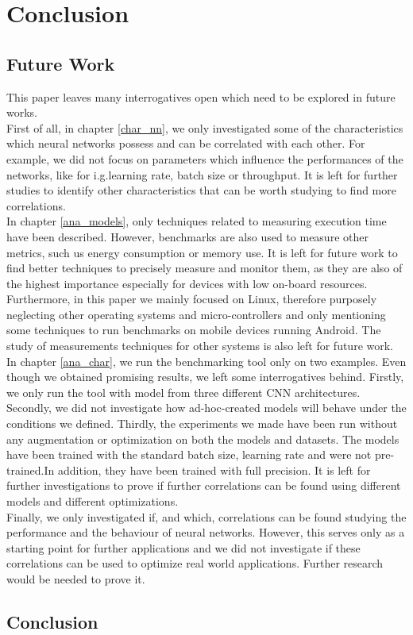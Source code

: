 \chapter{Conclusion}
\section{Future Work}
This paper leaves many interrogatives open which need to be explored in future works. \\
First of all, in chapter \ref{char_nn}, we only investigated some of the characteristics which neural networks possess and can be correlated with each other. For example, we did not focus on parameters which influence the performances of the networks, like for i.g.learning rate, batch size or throughput. It is left for further studies to identify other characteristics that can be worth studying to find more correlations.\\
In chapter \ref{ana_models}, only techniques related to measuring execution time have been described. However, benchmarks are also used to measure other metrics, such us energy consumption or memory use. It is left for future work to find better techniques to precisely measure and monitor them, as they are also of the highest importance especially for devices with low on-board resources. Furthermore, in this paper we mainly focused on Linux, therefore purposely neglecting other operating systems and micro-controllers and only mentioning some techniques to run benchmarks on mobile devices running Android. 
The study of measurements techniques for other systems is also left for future work. \\
In chapter \ref{ana_char}, we run the benchmarking tool only on two examples. Even though we obtained promising results, we left some interrogatives behind. Firstly, we only run the tool with model from three different CNN architectures. Secondly, we did not investigate how ad-hoc-created models will behave under the conditions we defined. Thirdly, the experiments we made have been run without any augmentation or optimization on both the models and datasets. The models have been trained with the standard batch size, learning rate and were not pre-trained.In addition, they have been trained with full precision. It is left for further investigations to prove if further correlations can be found using different models and different optimizations.\\
Finally, we only investigated if, and which, correlations can be found studying the performance and the behaviour of neural networks. However, this serves only as a starting point for further applications and we did not investigate if these correlations can be used to optimize real world applications. Further research would be needed to prove it. 

\section{Conclusion}